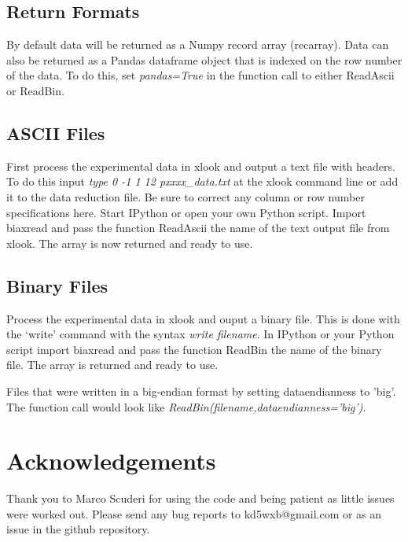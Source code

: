\subsection{Return Formats}
By default data will be returned as a Numpy record array (recarray).  Data can also be returned as a Pandas dataframe object that is indexed on the row number of the data.  To do this, set \emph{pandas=True} in the function call to either ReadAscii or ReadBin.

\subsection{ASCII Files}
First process the experimental data in xlook and output a text file with headers.  To do this input \emph{type 0 -1 1 12 pxxxx\_data.txt} at the xlook command line or add it to the data reduction file.  Be sure to correct any column or row number specifications here.  Start IPython or open your own Python script.  Import biaxread and pass the function ReadAscii the name of the text output file from xlook.  The array is now returned and ready to use.  


\subsection{Binary Files}
Process the experimental data in xlook and ouput a binary file.  This is done with the `write' command with the syntax \emph{write filename}.  In IPython or your Python script import biaxread and pass the function ReadBin the name of the binary file.  The array is returned and ready to use.

Files that were written in a big-endian format by setting dataendianness to 'big'.  The function call would look like \emph{ReadBin(filename,dataendianness='big')}.

\section{Acknowledgements}
Thank you to Marco Scuderi for using the code and being patient as little issues were worked out.  Please send any bug reports to kd5wxb@gmail.com or as an issue in the github repository.


\newpage

